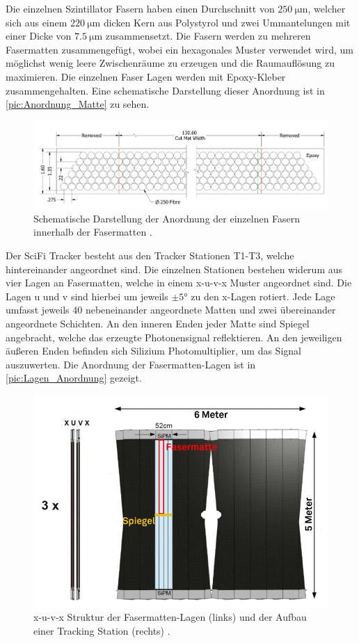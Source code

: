 Die einzelnen Szintillator Fasern haben einen Durchschnitt von $\qty{250}{\micro\metre}$, welcher sich aus einem
$\qty{220}{\micro\metre}$ dicken Kern aus Polystyrol und zwei Ummantelungen mit einer Dicke von $\qty{7.5}{\micro\metre}$
zusammensetzt. Die Fasern werden zu mehreren Fasermatten zusammengefügt, wobei ein hexagonales Muster
verwendet wird, um möglichst wenig leere Zwischenräume zu erzeugen und die Raumauflösung zu maximieren. Die einzelnen Faser Lagen
werden mit Epoxy-Kleber zusammengehalten. Eine schematische Darstellung dieser Anordnung ist in \autoref{pic:Anordnung_Matte} zu sehen.\\
\begin{figure}
    \centering
    \includegraphics[width = .8\textwidth]{content/pics/Anordnung.png}
    \caption{Schematische Darstellung der Anordnung der einzelnen Fasern innerhalb der Fasermatten \cite{SciFi_Versuch}.}
    \label{pic:Anordnung_Matte}
\end{figure}
Der SciFi Tracker besteht aus den Tracker Stationen T1-T3, welche hintereinander angeordnet sind. Die einzelnen 
Stationen bestehen widerum aus vier Lagen an Fasermatten, welche in einem x-u-v-x Muster angeordnet sind. Die Lagen u und v
sind hierbei um jeweils $\pm 5°$ zu den x-Lagen rotiert. Jede Lage umfasst jeweils 40 nebeneinander angeordnete Matten und zwei übereinander
angeordnete Schichten. An den inneren Enden jeder Matte sind Spiegel angebracht, welche das erzeugte Photonensignal 
reflektieren. An den jeweiligen äußeren Enden befinden sich Silizium Photomultiplier, um das Signal auszuwerten. Die Anordnung
der Fasermatten-Lagen ist in \autoref{pic:Lagen_Anordnung} gezeigt.
\begin{figure}
    \centering
    \includegraphics[width = .8\textwidth]{content/pics/Lagen_Anordnung.png}
    \caption{x-u-v-x Struktur der Fasermatten-Lagen (links) und der Aufbau einer Tracking Station (rechts) \cite{SciFi_Versuch}.}
    \label{pic:Lagen_Anordnung}
\end{figure}

